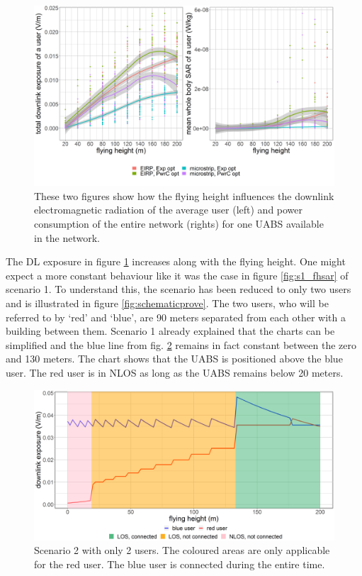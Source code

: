 \begin{figure}[h!]
  \includegraphics[width=\textwidth]{../results/s2/fhvsdlAndPc.png}
  \caption{These two figures show how the flying height influences the downlink electromagnetic radiation of the average user (left) and 
  power consumption of the entire network (rights) for one \gls{UABS} available in the network.}
  \label{fig:s2a_dlAndPc}
\end{figure}

The \gls{DL} exposure in figure \ref{fig:s2a_dlAndPc} increases along with the flying height. One might expect a more constant 
behaviour like it was the case in figure \ref{fig:s1_fhsar} of scenario 1. To understand this, the scenario has been reduced  
to only two users and is illustrated in figure \ref{fig:schematicprove}.
The two users, who will be referred to by `red' and `blue', are 90 meters separated from each other with a building between them.
Scenario 1 already explained that the charts can be simplified and the blue line from fig. \ref{fig:prove} remains in fact constant between the zero and 130 meters.
The chart shows that the \gls{UABS} is positioned above the blue user. The red user is in \gls{NLOS} as long as the \gls{UABS} remains below 20 meters.

\begin{figure}[]
  \includegraphics[width=\textwidth]{../results/s2/prove.png}
  \caption{Scenario 2 with only 2 users. The coloured areas are only applicable for the red user. The blue user is connected during the entire time.}
  \label{fig:prove}
\end{figure}



